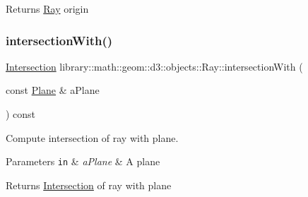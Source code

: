 \begin{DoxyReturn}{Returns}
\hyperlink{classlibrary_1_1math_1_1geom_1_1d3_1_1objects_1_1_ray}{Ray} origin 
\end{DoxyReturn}
\mbox{\label{classlibrary_1_1math_1_1geom_1_1d3_1_1objects_1_1_ray_a50ede8e46490ec58931cb82754de873f}} 
\subsubsection{\texorpdfstring{intersection\+With()}{intersectionWith()}\hspace{0.1cm}{\footnotesize\ttfamily [1/3]}}
{\footnotesize\ttfamily \hyperlink{classlibrary_1_1math_1_1geom_1_1d3_1_1_intersection}{Intersection} library\+::math\+::geom\+::d3\+::objects\+::\+Ray\+::intersection\+With (\begin{DoxyParamCaption}\item[{const \hyperlink{classlibrary_1_1math_1_1geom_1_1d3_1_1objects_1_1_plane}{Plane} \&}]{a\+Plane }\end{DoxyParamCaption}) const}



Compute intersection of ray with plane. 


\begin{DoxyParams}[1]{Parameters}
\mbox{\tt in}  & {\em a\+Plane} & A plane \\
\hline
\end{DoxyParams}
\begin{DoxyReturn}{Returns}
\hyperlink{classlibrary_1_1math_1_1geom_1_1d3_1_1_intersection}{Intersection} of ray with plane 
\end{DoxyReturn}
\mbox{\label{classlibrary_1_1math_1_1geom_1_1d3_1_1objects_1_1_ray_a54e7c2fa56bd086efbf85aa18674b403}} 
